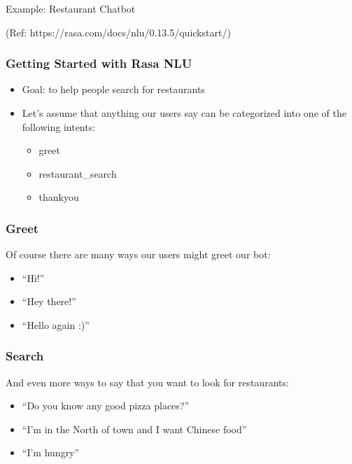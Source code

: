 \begin{frame}[fragile]\frametitle{}
\begin{center}
{\Large Example: Restaurant Chatbot}
\end{center}

{\tiny (Ref: https://rasa.com/docs/nlu/0.13.5/quickstart/)}
\end{frame}

 \begin{frame}[fragile]\frametitle{Getting Started with Rasa NLU}
\begin{itemize}
\item Goal: to help people search for restaurants
\item Let's assume that anything our users say can be categorized into one of the following intents:
\begin{itemize}
\item greet
\item restaurant\_search
\item thankyou
\end{itemize}
\end{itemize}
\end{frame}

 \begin{frame}[fragile]\frametitle{Greet}
 Of course there are many ways our users might greet our bot:
\begin{itemize}
\item ``Hi!''
\item ``Hey there!''
\item ``Hello again :)''
\end{itemize}
\end{frame}

 \begin{frame}[fragile]\frametitle{Search}
And even more ways to say that you want to look for restaurants:
\begin{itemize}
\item ``Do you know any good pizza places?''
\item ``I'm in the North of town and I want Chinese food''
\item ``I'm hungry''
\end{itemize}
\end{frame}

